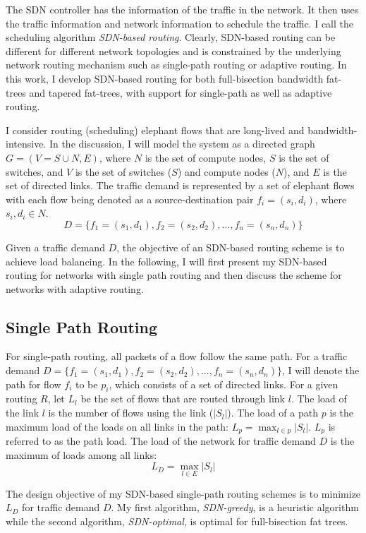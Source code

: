 The SDN controller has the information of the traffic in
the network. It then uses the traffic information and network information
to schedule the traffic. I call the scheduling algorithm {\em SDN-based
routing}. Clearly, SDN-based routing can be different
for different network topologies and is constrained by the underlying
network routing mechanism such as single-path routing or adaptive routing. 
In this work, I develop SDN-based routing for both full-bisection bandwidth
fat-trees and tapered fat-trees, with support for single-path as well as
adaptive routing.

I consider routing (scheduling) elephant flows that are long-lived
and bandwidth-intensive. In the discussion, I will
model the system as a directed
graph \( G = (V=S\cup N, E) \), where $N$ is the set of compute nodes,
$S$ is the set of switches, and $V$ is the set of switches ($S$) and
compute nodes ($N$), and \( E \) is the set of directed links.
The traffic demand is represented by a set of
elephant flows with each flow being denoted as a source-destination pair
$f_i = (s_i, d_i)$, where $s_i, d_i \in N$.
\[D = \{f_1=(s_1, d_1), f_2=(s_2, d_2), ..., f_n = (s_n, d_n)\}\] 

Given a traffic demand $D$, the objective of an SDN-based routing scheme is to
achieve load balancing. In the following, I will first present my SDN-based
routing for networks with single path routing and then discuss the
scheme for networks with adaptive routing.

\subsection{Single Path Routing}

For single-path routing, all packets of a flow
follow the same path. For a traffic demand
$D = \{f_1=(s_1, d_1), f_2=(s_2, d_2), ..., f_n = (s_n, d_n)\}$, 
I will denote the path for flow $f_i$ to be $p_i$, which consists of a set
of directed links. For a given routing $R$,
let $L_l$ be the set of flows that are routed through link $l$.
The load of the link $l$ is the number of flows using the link ($|S_l|$).
The load of a path $p$ is the maximum load of the loads on all links
in the path: $L_p = \max_{l \in p} {|S_l|}$. $L_p$ is referred to as the path
load. The load of the network for traffic demand $D$
is the maximum of loads among all links:
\[L_D = \max_{l\in E} {|S_l|}\]

The design objective of my SDN-based single-path routing schemes is to
minimize $L_D$ for traffic demand $D$. My first algorithm,
\textit{SDN-greedy}, is a heuristic algorithm while the second algorithm,
\textit{SDN-optimal}, is optimal for full-bisection fat trees. 

